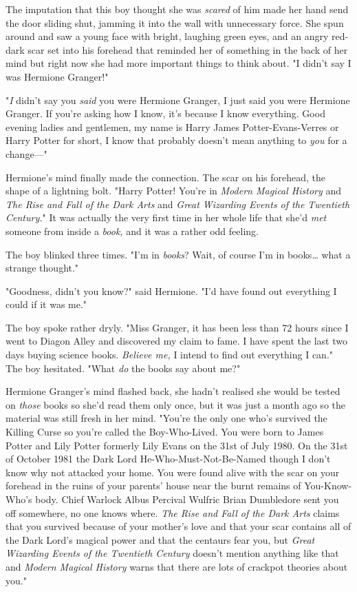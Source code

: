 The imputation that this boy thought she was \emph{scared} of him made her hand send the door sliding shut, jamming it into the wall with unnecessary force. She spun around and saw a young face with bright, laughing green eyes, and an angry red-dark scar set into his forehead that reminded her of something in the back of her mind but right now she had more important things to think about. "I didn't say I was Hermione Granger!"

"\emph{I} didn't say you \emph{said} you were Hermione Granger, I just said you were Hermione Granger. If you're asking how I know, it's because I know everything. Good evening ladies and gentlemen, my name is Harry James Potter-Evans-Verres or Harry Potter for short, I know that probably doesn't mean anything to \emph{you} for a change---"

Hermione's mind finally made the connection. The scar on his forehead, the shape of a lightning bolt. "Harry Potter! You're in \emph{Modern Magical History} and \emph{The Rise and Fall of the Dark Arts} and \emph{Great Wizarding Events of the Twentieth Century.}" It was actually the very first time in her whole life that she'd \emph{met} someone from inside a \emph{book,} and it was a rather odd feeling.

The boy blinked three times. "I'm in \emph{books}? Wait, of course I'm in books{\ldots} what a strange thought."

"Goodness, didn't you know?" said Hermione. "I'd have found out everything I could if it was me."

The boy spoke rather dryly. "Miss Granger, it has been less than 72 hours since I went to Diagon Alley and discovered my claim to fame. I have spent the last two days buying science books. \emph{Believe me,} I intend to find out everything I can." The boy hesitated. "What \emph{do} the books say about me?"

Hermione Granger's mind flashed back, she hadn't realised she would be tested on \emph{those} books so she'd read them only once, but it was just a month ago so the material was still fresh in her mind. "You're the only one who's survived the Killing Curse so you're called the Boy-Who-Lived. You were born to James Potter and Lily Potter formerly Lily Evans on the 31st of July 1980. On the 31st of October 1981 the Dark Lord He-Who-Must-Not-Be-Named though I don't know why not attacked your home. You were found alive with the scar on your forehead in the ruins of your parents' house near the burnt remains of You-Know-Who's body. Chief Warlock Albus Percival Wulfric Brian Dumbledore sent you off somewhere, no one knows where. \emph{The Rise and Fall of the Dark Arts} claims that you survived because of your mother's love and that your scar contains all of the Dark Lord's magical power and that the centaurs fear you, but \emph{Great Wizarding Events of the Twentieth Century} doesn't mention anything like that and \emph{Modern Magical History} warns that there are lots of crackpot theories about you."

